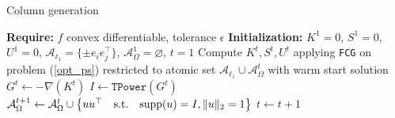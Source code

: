 \begin{algorithm}
\caption{Column generation}
\label{alg:colgen_ggm}
\begin{algorithmic}[1]
\State\textbf{Require: } $f$ convex differentiable, tolerance $\epsilon$ 
\State\textbf{Initialization: } $K^{1}=0$,  $S^{1}=0$, $U^{1}=0$, $\mathcal{A}_{\ell_{1}}=\{\pm e_i e_j^{\top}\}$, $\mathcal{A}^{1}_{\Omega}=\varnothing$, $t=1$
\State Compute $K^{t},S^{t},U^{t}$ applying \texttt{FCG} on problem (\ref{opt_ps}) restricted to atomic set $\mathcal{A}_{\ell_{1}} \cup \mathcal{A}_{\Omega}^{t}$ with warm start solution
\State $G^{t}\gets -\nabla(K^t)$
\State $I \gets \texttt{TPower}(G^{t})$
\State $\mathcal{A}_{\Omega}^{t+1}\gets \mathcal{A}_{\Omega}^{t}
 \cup \big\{uu^{\top} \quad \text{s.t.} \quad \text{supp}(u)=I, \|u\|_{2}=1 \big\} $
\EndIf
\State $t \gets t+1$
\EndWhile
\end{algorithmic}
  \end{algorithm}







